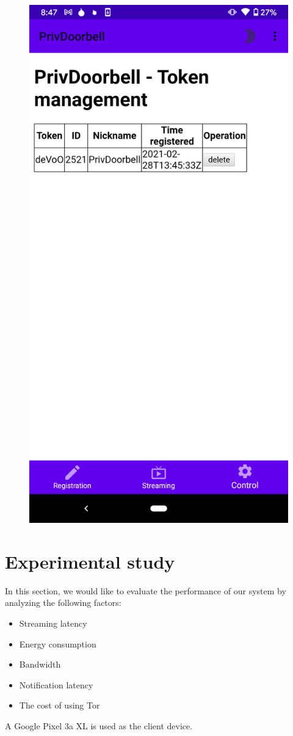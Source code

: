 \begin{figure}
\begin{minipage}[t]{0.3\linewidth}
		\caption{}
		\label{fig:app_sc_management}
	\end{minipage}
	\begin{minipage}[t]{0.3\linewidth}
		\includegraphics[width=0.5\linewidth]{app_sc_token_revoke.png}
		\caption{}
		\label{fig:app_sc_token_revoke}
	\end{minipage}	
\end{figure}


\section{Experimental study}
In this section, we would like to evaluate the performance of our system by analyzing the following factors:
\begin{itemize}
	\item Streaming latency
	\item Energy consumption
	\item Bandwidth
	\item Notification latency
	\item The cost of using Tor
\end{itemize}

A Google Pixel 3a XL is used as the client device.

